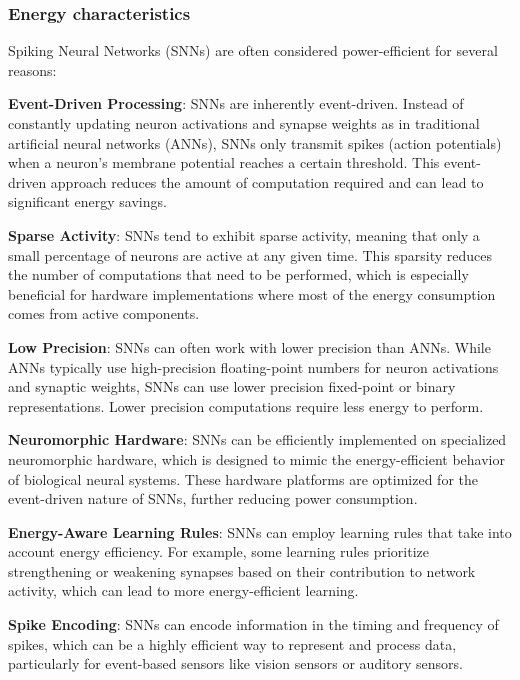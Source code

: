 \begin{frame}[allowframebreaks]
	\frametitle{Energy characteristics}
	
		\par Spiking Neural Networks (SNNs) are often considered power-efficient for several reasons:
		
		\par \textbf{Event-Driven Processing}: SNNs are inherently event-driven. Instead of constantly updating neuron activations and synapse weights as in traditional artificial neural networks (ANNs), SNNs only transmit spikes (action potentials) when a neuron's membrane potential reaches a certain threshold. This event-driven approach reduces the amount of computation required and can lead to significant energy savings.
		
		\par \textbf{Sparse Activity}: SNNs tend to exhibit sparse activity, meaning that only a small percentage of neurons are active at any given time. This sparsity reduces the number of computations that need to be performed, which is especially beneficial for hardware implementations where most of the energy consumption comes from active components.
		
		\par \textbf{Low Precision}: SNNs can often work with lower precision than ANNs. While ANNs typically use high-precision floating-point numbers for neuron activations and synaptic weights, SNNs can use lower precision fixed-point or binary representations. Lower precision computations require less energy to perform.
		
		\par \textbf{Neuromorphic Hardware}: SNNs can be efficiently implemented on specialized neuromorphic hardware, which is designed to mimic the energy-efficient behavior of biological neural systems. These hardware platforms are optimized for the event-driven nature of SNNs, further reducing power consumption.
		
		\par \textbf{Energy-Aware Learning Rules}: SNNs can employ learning rules that take into account energy efficiency. For example, some learning rules prioritize strengthening or weakening synapses based on their contribution to network activity, which can lead to more energy-efficient learning.
		
		\par \textbf{Spike Encoding}: SNNs can encode information in the timing and frequency of spikes, which can be a highly efficient way to represent and process data, particularly for event-based sensors like vision sensors or auditory sensors.
\end{frame}


